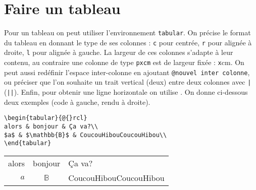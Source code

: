 \documentclass[12pt,a4paper,fleqn]{article}
\begin{document}
\section{Faire un tableau}
Pour un tableau on peut utiliser
l'environnement \texttt{tabular}.
On précise le format du tableau
en donnant le type de ses colonnes :
\texttt{c} pour centrée,
\texttt{r} pour alignée à droite,
\texttt{l} pour alignée à gauche.
La largeur de ces colonnes s'adapte à leur contenu,
au contraire une colonne de type \texttt{p{xcm}}
est de largeur fixée : \texttt{x}cm.
On peut aussi redéfinir l'espace inter-colonne 
en ajoutant \texttt{@{nouvel inter colonne}},
ou préciser que l'on souhaite un trait vertical (\resp deux)
entre deux colonnes
avec \texttt{|} (\resp \texttt{||}).
Enfin, pour obtenir une ligne horizontale 
on utilise \texttt{\hline}.
On donne ci-dessous deux exemples (code à gauche, rendu à droite).
\\


\noindent
\begin{minipage}{0.54\textwidth}
\begin{verbatim}
\begin{tabular}{@{}rcl}
alors & bonjour & Ça va?\\
$a$ & $\mathbb{B}$ & CoucouHibouCoucouHibou\\
\end{tabular}
\end{verbatim}
\end{minipage}
\hspace*{0.1cm}\color{expli}\vrule \color{black}\hspace*{0.1cm}
\begin{minipage}{0.46\textwidth}
\begin{tabular}{@{}rcl}
alors & bonjour & Ça va?\\
$a$ & $\mathbb{B}$ & CoucouHibouCoucouHibou\\
\end{tabular}
\end{minipage}\\[0.6cm]
\end{document}

